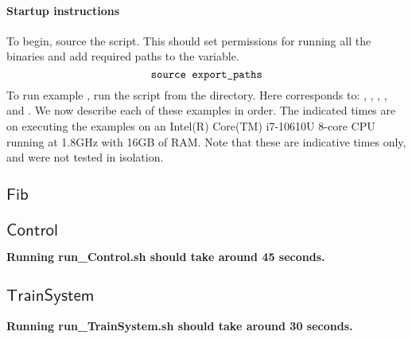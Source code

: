 \documentclass[runningheads]{llncs}
\begin{document}
\paragraph{Startup instructions}
To begin, source the  script. 
This should set permissions for running all the binaries and add required paths to the  variable.
\begin{equation*}
    \texttt{source export\_paths}
\end{equation*}
To run example , 
run the script  
from the  directory.
Here  corresponds to:
, ,
, , and .
We now describe each of these examples in order. The indicated times are on executing the examples on an Intel(R) Core(TM) i7-10610U 8-core CPU running at 1.8GHz with 16GB of RAM. Note that these are indicative times only, and were not tested in isolation.

\newcommand{\excommand}[1]{$\mathsf{#1}$}

\subsection{\excommand{Fib}}


\subsection{\excommand{Control}}

\textbf{Running run\_Control.sh should take around 45 seconds.}

\subsection{\excommand{TrainSystem}}

\textbf{Running run\_TrainSystem.sh should take around 30 seconds.}
\end{document}
